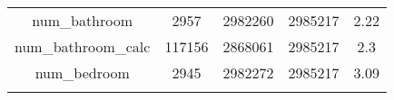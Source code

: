 \documentclass[]{book}
\theoremstyle{definition}
\theoremstyle{definition}
\theoremstyle{definition}
\theoremstyle{remark}
\begin{document}
\begin{longtable}[]{@{}ccccc@{}}
\begin{minipage}[t]{0.33\columnwidth}\centering\strut
num\_bathroom\strut
\end{minipage} & \begin{minipage}[t]{0.12\columnwidth}\centering\strut
2957\strut
\end{minipage} & \begin{minipage}[t]{0.13\columnwidth}\centering\strut
2982260\strut
\end{minipage} & \begin{minipage}[t]{0.12\columnwidth}\centering\strut
2985217\strut
\end{minipage} & \begin{minipage}[t]{0.13\columnwidth}\centering\strut
2.22\strut
\end{minipage}\tabularnewline
\begin{minipage}[t]{0.33\columnwidth}\centering\strut
num\_bathroom\_calc\strut
\end{minipage} & \begin{minipage}[t]{0.12\columnwidth}\centering\strut
117156\strut
\end{minipage} & \begin{minipage}[t]{0.13\columnwidth}\centering\strut
2868061\strut
\end{minipage} & \begin{minipage}[t]{0.12\columnwidth}\centering\strut
2985217\strut
\end{minipage} & \begin{minipage}[t]{0.13\columnwidth}\centering\strut
2.3\strut
\end{minipage}\tabularnewline
\begin{minipage}[t]{0.33\columnwidth}\centering\strut
num\_bedroom\strut
\end{minipage} & \begin{minipage}[t]{0.12\columnwidth}\centering\strut
2945\strut
\end{minipage} & \begin{minipage}[t]{0.13\columnwidth}\centering\strut
2982272\strut
\end{minipage} & \begin{minipage}[t]{0.12\columnwidth}\centering\strut
2985217\strut
\end{minipage} & \begin{minipage}[t]{0.13\columnwidth}\centering\strut
3.09\strut
\end{minipage}\tabularnewline
\begin{minipage}[t]{0.33\columnwidth}\centering\strut

\end{minipage}
\end{longtable}
\end{document}
